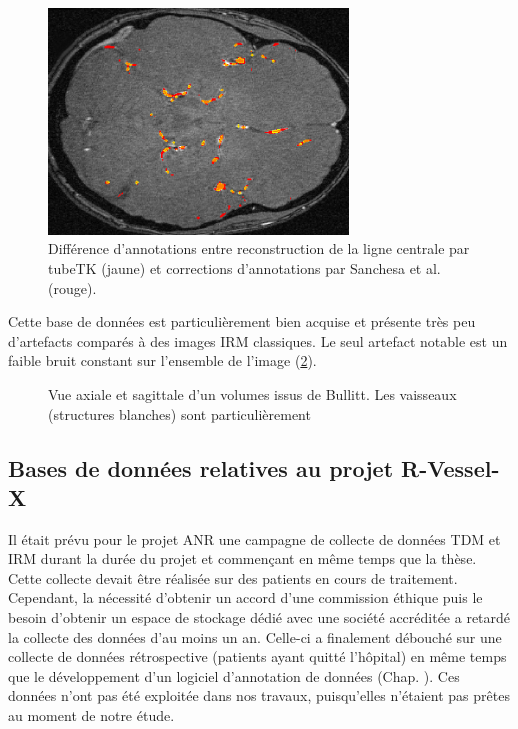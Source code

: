 \begin{figure}
    \centering
    \includegraphics[height=6cm]{Images/Bullitt_annotation_ameliorations.png}
    \caption{Différence d'annotations entre reconstruction de la ligne centrale par tubeTK (jaune) et corrections d'annotations par Sanchesa et al. (rouge). }
    \label{fig:Bullitt_annotation_ameliorations}
\end{figure}

Cette base de données est particulièrement bien acquise et présente très peu d'artefacts comparés à des images IRM classiques. Le seul artefact notable est un faible bruit constant sur l'ensemble de l'image (\ref{fig:Bullitt_example}).

\begin{figure}
    \centering
    \caption{Vue axiale et sagittale d'un volumes issus de Bullitt. Les vaisseaux (structures blanches) sont particulièrement}
    \label{fig:Bullitt_example}
\end{figure}


\subsection{Bases de données relatives au projet R-Vessel-X}

Il était prévu pour le projet ANR une campagne de collecte de données TDM et IRM durant la durée du projet et commençant en même temps que la thèse. Cette collecte devait être réalisée sur des patients en cours de traitement. Cependant, la nécessité d'obtenir un accord d'une commission éthique puis le besoin d'obtenir un espace de stockage dédié avec une société accréditée a retardé la collecte des données d'au moins un an. Celle-ci a finalement débouché sur une collecte de données rétrospective (patients ayant quitté l'hôpital) en même temps que le développement d'un logiciel d'annotation de données (Chap. \chapReproN{}). Ces données n'ont pas été exploitée dans nos travaux, puisqu’elles n’étaient pas prêtes au moment de notre étude.

